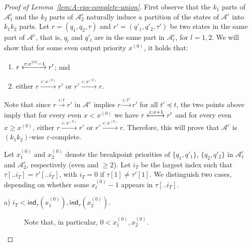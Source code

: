 \documentclass[a4paper,UKenglish,cleveref, thm-restate]{lipics-v2021}
\newcommand{\re}[1]{\xrightarrow{#1}}
\newcommand{\rer}[1]{\xleftrightarrow{#1}}
\newcommand{\eps}{\varepsilon}
\newcommand{\A}{\mathcal{A}}
\newcommand{\cleq}{\preccurlyeq}
\newcommand{\indtau}[1]{\mathsf{ind}_\tau(#1)}
\newcommand{\xbreak}{x^{(0)}}
\begin{document}
\begin{proof}[Proof of Lemma~\ref{lem:A-eps-complete-union}]
First observe that the $k_1$ parts of $\A_1^\eps$ and the $k_2$ parts of $\A_2^\eps$ naturally induce a partition of the states of $\A^\eps$ into $k_1k_2$ parts.
    Let $r=(q_{1},q_{2},\tau)$ and $r'=(q'_{1}, q'_{2},\tau')$ be two states in the same part of $\A^\eps$, that is, $q_{l}$ and $q'_{l}$ are in the same part in $\A_{l}^\eps$, for $l=1,2$.
We will show that for some even output priority $\xbreak$, it holds that:
    \begin{enumerate}[1.]
        \item\label{item:small-odd} $r \rer{\eps:\xbreak-1} r'$; and
        \item\label{item:large-even} either $r \re{\eps:\xbreak} r'$ or $r' \re{\eps:\xbreak} r$.
    \end{enumerate}
    Note that since $r\re{\eps:t} r'$ in $\A^\eps$ implies $r \re{\eps:t'} r'$ for all $t'\cleq t$, the two points above imply that for every even $x < \xbreak$ we have $r \rer{\eps:x+1} r'$ and for every even $x \geq \xbreak$, 
    either $r \re{\eps:\xbreak} r'$ or $r' \re{\eps:\xbreak} r$.
    Therefore, this will prove that $\A^\eps$ is $(k_{1}k_{2})$-wise $\eps$-complete.

    Let $\xbreak_{1}$ and $\xbreak_{2}$ denote the breakpoint priorities of $\{q_{1},q'_{1}\}$, $\{q_{2}, q'_{2}\}$ in $\A_1^\eps$ and $\A_2^\eps$, respectively (even and $\geq 2$).
    Let $i_T$ be the largest index such that $\tau[..i_T] = \tau'[..i_T]$, with $i_T=0$ if $\tau[1]\neq \tau'[1]$.
We distinguish two cases, depending on whether some $\xbreak_l-1$ appears in  $\tau[..i_T]$.

    \begin{description}
        \item[a) $i_T < \indtau{\xbreak_1}, \indtau{\xbreak_2}$.]
        Note that, in particular, $0<\xbreak_{1}, \xbreak_2$. 


\end{description}
\end{proof}
\end{document}
